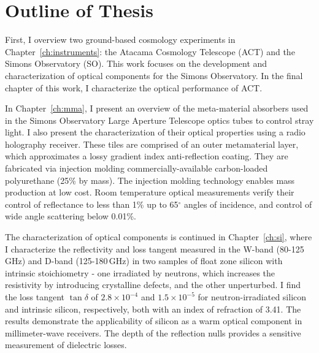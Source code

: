 
\section{Outline of Thesis}

First, I overview two ground-based cosmology experiments in Chapter~\ref{ch:instruments}: the Atacama Cosmology Telescope (ACT) and the Simons Observatory (SO).  This work focuses on the development and characterization of optical components for the Simons Observatory.  In the final chapter of this work, I characterize the optical performance of ACT.

In Chapter~\ref{ch:mma}, I present an overview of the meta-material absorbers used in the Simons Observatory Large Aperture Telescope optics tubes to control stray light.  I also present the characterization of their optical properties using a radio holography receiver.  These tiles are comprised of an outer metamaterial layer, which approximates a lossy gradient index anti-reflection coating. They are fabricated via injection molding commercially-available carbon-loaded polyurethane (25\% by mass). The injection molding technology enables mass production at low cost.  Room temperature optical measurements verify their control of reflectance to less than 1\% up to 65$^{\circ}$ angles of incidence, and control of wide angle scattering below 0.01\%.

The characterization of optical components is continued in Chapter~\ref{ch:si}, where I characterize the reflectivity and loss tangent measured in the W-band (80-125\,GHz) and D-band (125-180\,GHz) in two samples of float zone silicon with intrinsic stoichiometry - one irradiated by neutrons, which increases the resistivity by introducing crystalline defects, and the other unperturbed.  I find the loss tangent $\tan\delta$ of $2.8\times10^{-4}$ and $1.5\times10^{-5}$ for neutron-irradiated silicon and intrinsic silicon, respectively, both with an index of refraction of 3.41.  The results demonstrate the applicability of silicon as a warm optical component in millimeter-wave receivers.  The depth of the reflection nulls provides a sensitive measurement of dielectric losses.

